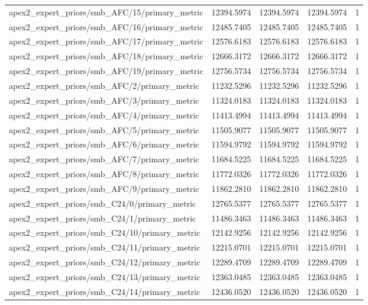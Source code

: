 \begin{table}[h]
\begin{tabular}{lrrrr}
apex2_expert_priors/smb_AFC/15/primary_metric & 12394.5974 & 12394.5974 & 12394.5974 & 1 \\
apex2_expert_priors/smb_AFC/16/primary_metric & 12485.7405 & 12485.7405 & 12485.7405 & 1 \\
apex2_expert_priors/smb_AFC/17/primary_metric & 12576.6183 & 12576.6183 & 12576.6183 & 1 \\
apex2_expert_priors/smb_AFC/18/primary_metric & 12666.3172 & 12666.3172 & 12666.3172 & 1 \\
apex2_expert_priors/smb_AFC/19/primary_metric & 12756.5734 & 12756.5734 & 12756.5734 & 1 \\
apex2_expert_priors/smb_AFC/2/primary_metric & 11232.5296 & 11232.5296 & 11232.5296 & 1 \\
apex2_expert_priors/smb_AFC/3/primary_metric & 11324.0183 & 11324.0183 & 11324.0183 & 1 \\
apex2_expert_priors/smb_AFC/4/primary_metric & 11413.4994 & 11413.4994 & 11413.4994 & 1 \\
apex2_expert_priors/smb_AFC/5/primary_metric & 11505.9077 & 11505.9077 & 11505.9077 & 1 \\
apex2_expert_priors/smb_AFC/6/primary_metric & 11594.9792 & 11594.9792 & 11594.9792 & 1 \\
apex2_expert_priors/smb_AFC/7/primary_metric & 11684.5225 & 11684.5225 & 11684.5225 & 1 \\
apex2_expert_priors/smb_AFC/8/primary_metric & 11772.0326 & 11772.0326 & 11772.0326 & 1 \\
apex2_expert_priors/smb_AFC/9/primary_metric & 11862.2810 & 11862.2810 & 11862.2810 & 1 \\
apex2_expert_priors/smb_C24/0/primary_metric & 12765.5377 & 12765.5377 & 12765.5377 & 1 \\
apex2_expert_priors/smb_C24/1/primary_metric & 11486.3463 & 11486.3463 & 11486.3463 & 1 \\
apex2_expert_priors/smb_C24/10/primary_metric & 12142.9256 & 12142.9256 & 12142.9256 & 1 \\
apex2_expert_priors/smb_C24/11/primary_metric & 12215.0701 & 12215.0701 & 12215.0701 & 1 \\
apex2_expert_priors/smb_C24/12/primary_metric & 12289.4709 & 12289.4709 & 12289.4709 & 1 \\
apex2_expert_priors/smb_C24/13/primary_metric & 12363.0485 & 12363.0485 & 12363.0485 & 1 \\
apex2_expert_priors/smb_C24/14/primary_metric & 12436.0520 & 12436.0520 & 12436.0520 & 1 \\

\end{tabular}
\end{table}
